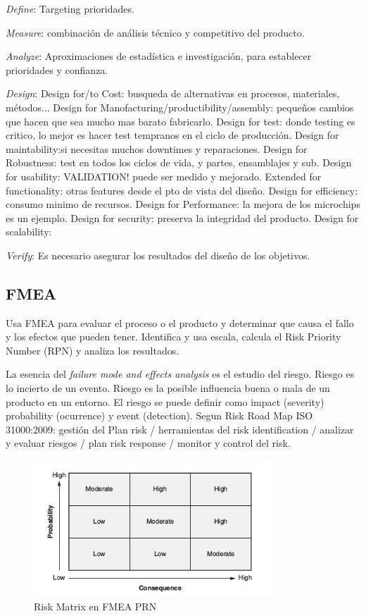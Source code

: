 \documentclass[]{article}
\begin{document}
\textit{Define}: Targeting prioridades.

\textit{Measure}: combinación de análisis técnico y competitivo del producto. 

\textit{Analyze}: Aproximaciones de estadística e investigación, para establecer prioridades y confianza.

\textit{Design}: Design for/to Cost: busqueda de alternativas en procesos, materiales, métodos... Design for Manofacturing/productibility/assembly: pequeños cambios que hacen que sea mucho mas barato fabricarlo. Design for test: donde testing es critico, lo mejor es hacer test tempranos en el ciclo de producción. Design for maintability:si necesitas muchos downtimes y reparaciones. Design for Robustness: test en todos los ciclos de vida, y partes, ensamblajes y sub. Design for usability: VALIDATION!  puede ser medido y mejorado. Extended for functionality: otras features desde el pto de vista del diseño. Design for efficiency: consumo minimo de recursos. Design for Performance: la mejora de los microchips es un ejemplo. Design for security: preserva la integridad del producto. Design for scalability: 

\textit{Verify}: Es necesario asegurar los resultados del diseño de los objetivos. 

\subsection{FMEA} Usa FMEA para evaluar el proceso o el producto y determinar que causa el fallo y los efectos que pueden tener. 
Identifica y usa escala, calcula el Risk Priority Number (RPN) y analiza los resultados.

La esencia del \textit{failure mode and effects analysis} es el estudio del riesgo. Riesgo es lo incierto de un evento. Riesgo es la posible influencia buena o mala de un producto en un entorno. El riesgo se puede definir como impact (severity)  probability (ocurrence) y event (detection). Segun Risk Road Map ISO 31000:2009: gestión del Plan risk / herramientas del risk identification / analizar y evaluar riesgos / plan risk response / monitor y control del risk.

\begin{figure}[ht!]
	\centering
	\includegraphics[width=90mm]{imagenes/RiskMatrix.png}
	\caption{Risk Matrix en FMEA PRN}
	\label{fig:kMatrix}
\end{figure}
\end{document}
